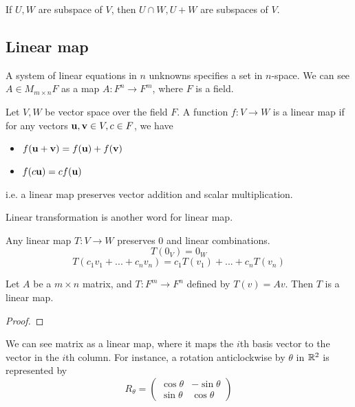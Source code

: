 \documentclass[11pt]{article}
\begin{document}
\begin{theorem}
  If \(U,W\) are subspace of \(V\), then \(U \cap W, U+W\) are subspaces of \(V\).
\end{theorem}

\subsection{Linear map}
A system of linear equations in \(n\) unknowns specifies a set in \(n\)-space. We can see \(A\in{M_{m\times n}F}\) as a map \(A:F^n\to F^m\), where \(F\) is a field.

\begin{definition}
  Let \(V,W\) be vector space over the field \(F\). A function \(f:V\to W\) is a linear map if for any vectors \(\bf{u},\bf{v}\in V, c\in F\), we have
  \begin{itemize}
    \item \(f(\bf{u}+\bf{v})=f(\bf{u})+f(\bf{v})\)
    \item \(f(c\bf{u})=cf(\bf{u})\)
  \end{itemize}
  i.e. a linear map preserves vector addition and scalar multiplication.
\end{definition}
Linear transformation is another word for linear map.
\begin{theorem}
  Any linear map \(T:V\to W\) preserves \(0\) and linear combinations.
  \[T(0_V)=0_W\]
  \[T(c_1v_1+...+c_nv_n)=c_1T(v_1)+...+c_nT(v_n)\]
\end{theorem}

\begin{theorem}
  Let \(A\) be a \(m\times n\) matrix, and \(T:F^m\to F^n\) defined by \(T(v)=Av\). Then \(T\) is a linear map. 
\end{theorem}
\begin{proof}
  
\end{proof}

We can see matrix as a linear map, where it maps the \(i\)th basis vector to the vector in the \(i\)th column. For instance, a rotation anticlockwise by \(\theta\) in \(\R^2\) is represented by 
\begin{equation*}
  R_\theta = 
  \begin{pmatrix}
    \cos\theta & -\sin\theta\\
    \sin\theta & \cos\theta
  \end{pmatrix}
\end{equation*}
\end{document}
